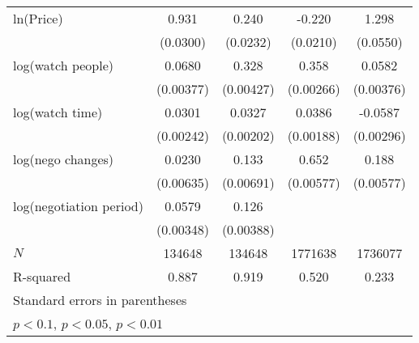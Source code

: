 {\begin{tabular}{l*{4}{c}}
\addlinespace
ln(Price)&       0.931\sym{***}&       0.240\sym{***}&      -0.220\sym{***}&       1.298\sym{***}\\
            &    (0.0300)         &    (0.0232)         &    (0.0210)         &    (0.0550)         \\
\addlinespace
log(watch people)&      0.0680\sym{***}&       0.328\sym{***}&       0.358\sym{***}&      0.0582\sym{***}\\
            &   (0.00377)         &   (0.00427)         &   (0.00266)         &   (0.00376)         \\
\addlinespace
log(watch time)&      0.0301\sym{***}&      0.0327\sym{***}&      0.0386\sym{***}&     -0.0587\sym{***}\\
            &   (0.00242)         &   (0.00202)         &   (0.00188)         &   (0.00296)         \\
\addlinespace
log(nego changes)&      0.0230\sym{***}&       0.133\sym{***}&       0.652\sym{***}&       0.188\sym{***}\\
            &   (0.00635)         &   (0.00691)         &   (0.00577)         &   (0.00577)         \\
\addlinespace
log(negotiation period)&      0.0579\sym{***}&       0.126\sym{***}&                     &                     \\
            &   (0.00348)         &   (0.00388)         &                     &                     \\
\midrule
\(N\)       &      134648         &      134648         &     1771638         &     1736077         \\
R-squared   &       0.887         &       0.919         &       0.520         &       0.233         \\
\bottomrule
\multicolumn{5}{l}{\footnotesize Standard errors in parentheses}\\
\multicolumn{5}{l}{\footnotesize \sym{*} \(p<0.1\), \sym{**} \(p<0.05\), \sym{***} \(p<0.01\)}\\
\end{tabular}
}
